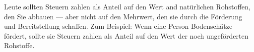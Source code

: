 Leute sollten Steuern zahlen als Anteil auf den Wert and natürlichen Rohstoffen, den Sie abbauen --- aber nicht auf den Mehrwert, den sie durch die Förderung und Bereitstellung schaffen.
Zum Beispiel: Wenn eine Person Bodenschätze fördert, sollte sie Steuern zahlen als Anteil auf den Wert der noch ungeförderten Rohstoffe.